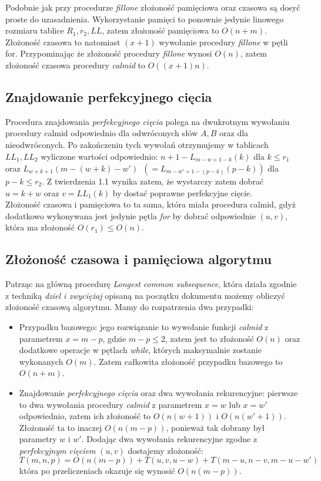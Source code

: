 \documentclass[12pt]{article}
\theoremstyle{definition}
\theoremstyle{definition}
\theoremstyle{definition}
\begin{document}
Podobnie jak przy procedurze \textit{fillone} złożoność pamięciowa oraz czasowa są dosyć proste do uzasadnienia.
Wykorzystanie pamięci to ponownie jedynie linowego rozmiaru tablice $R_1, r_2, LL$, zatem złożoność pamięciowa to $O(n + m)$.\\
Złożoność czasowa to natomiast $(x + 1)$ wywołanie procedury \textit{fillone} w pętli for. Przypominając że złożoność procedury \textit{fillone} wynosi $O(n)$, zatem złożoność czasowa procedury \textit{calmid} to $O((x+1)n)$.

\subsection{Znajdowanie perfekcyjnego cięcia}

Procedura znajdowania \textit{perfekcyjnego cięcia} polega na dwukrotnym wywołaniu procedury calmid odpowiednio dla odwróconych słów $A, B$ oraz dla nieodwróconych. Po zakończeniu tych wywołań otrzymujemy w tablicach $LL_1, LL_2$ wyliczone wartości odpowiednio: $n + 1 - L_{m-w+1-k}(k)$ dla $k \leq r_1$ oraz $L_{w+k+1}(m-(w+k)-w')$\ $(= L_{m-w'+1-(p-k)}(p-k))$ dla $p-k \leq r_2$. Z twierdzenia 1.1 wynika zatem, że wystarczy zatem dobrać $u = k + w$ oraz $v = LL_1(k)$ by dostać poprawne perfekcyjne cięcie.\\
Złożoność czasowa i pamięciowa to ta sama, która miała procedura calmid, gdyż dodatkowo wykonywana jest jedynie pętla \textit{for} by dobrać odpowiednie $(u, v)$, która ma złożoność $O(r_1) \leq O(n)$.

\subsection{Złożoność czasowa i pamięciowa algorytmu}
Patrząc na główną procedurę \textit{Longest common subsequence}, która działa zgodnie z techniką \textit{dziel i zwyciężaj} opisaną na początku dokumentu możemy obliczyć złożoność czasową algorytmu.
Mamy do rozpatrzenia dwa przypadki:
\begin{itemize}
    \item Przypadku bazowego: jego rozwiązanie to wywołanie funkcji \textit{calmid} z parametrem $x = m-p$, gdzie $m - p \leq 2$, zatem jest to złożoność $O(n)$ oraz dodatkowe operacje w pętlach \textit{while}, których maksymalnie zostanie wykonanych $O(m)$. Zatem całkowita złożoność przypadku bazowego to $O(n + m)$.
    \item Znajdowanie \textit{perfekcyjnego cięcia} oraz dwa wywołania rekurencyjne: pierwsze to dwa wywołania procedury \textit{calmid} z parametrem $x = w$ lub $x = w'$ odpowiednio, zatem ich złożoność to $O(n(w + 1))$ i $O(n(w' + 1))$. Złożoność ta to inaczej $O(n(m - p))$, ponieważ tak dobrany był parametry $w$ i $w'$. Dodając dwa wywołania rekurencyjne zgodne z \textit{perfekcyjnym cięciem} $(u, v)$ dostajemy złożoność:
    \[
        T(m, n, p) = O(n(m - p)) + T(u, v, u - w) + T(m - u, n - v, m - u - w')
    \]
    która po przeliczeniach okazuje się wynosić $O(n(m - p))$.
\end{itemize}
\end{document}

